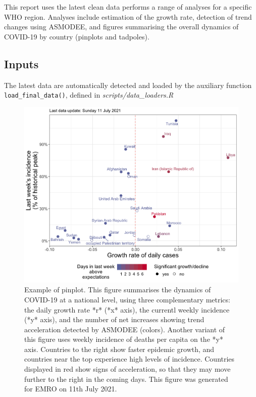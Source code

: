\documentclass[]{book}
\begin{document}
This report uses the latest clean data performs a range of analyses for a
specific WHO region. Analyses include estimation of the growth rate, detection
of trend changes using ASMODEE, and figures summarising the overall dynamics of
COVID-19 by country (pinplots and tadpoles).

\hypertarget{inputs-1}{%
\subsection{Inputs}\label{inputs-1}}

The latest data are automatically detected and loaded by the auxiliary function
\texttt{load\_final\_data()}, defined in \emph{scripts/data\_loaders.R}

\begin{figure}

{\centering \includegraphics{images/example_pinplot} 

}

\caption{Example of pinplot. This figure summarises the dynamics of COVID-19 at a national level, using three complementary metrics: the daily growth rate *r* (*x* axis), the currentl weekly incidence (*y* axis), and the number of net increases showing trend acceleration detected by ASMODEE (colors). Another variant of this figure uses weekly incidence of deaths per capita on the *y* axis. Countries to the right show faster epidemic growth, and countries near the top experience high levels of incidence. Countries displayed in red show signs of acceleration, so that they may move further to the right in the coming days. This figure was generated for EMRO on 11th July 2021.}\label{fig:pinplot}
\end{figure}
\end{document}
